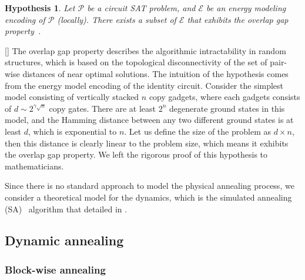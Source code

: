 \documentclass[twocolumn,superscriptaddress,english,showpacs,longbibliography]{revtex4-2}
\newtheorem{hyp}{Hypothesis}
\newcommand{\jinguo}[1]{[{\color{blue}{JGL: #1}}]}
\newcommand{\ym}[1]{[{\color{red}{YM: #1}}]}
\begin{document}
\begin{hyp}\label{hyp:overlap-gap}
Let $\mathcal{P}$ be a circuit SAT problem, and $\mathcal{E}$ be an energy modeling encoding of $\mathcal{P}$ (locally). There exists a subset of $\mathcal{E}$ that exhibits the overlap gap property~\cite{Gamarnik2021}.
\end{hyp}
\ym{I don't understand the following sentence. ``...set of ...'' seems weird.}
The overlap gap property describes the algorithmic intractability in random structures, which is based on the topological disconnectivity of the set of pair-wise distances of near optimal solutions.
The intuition of the hypothesis comes from the energy model encoding of the identity circuit.
Consider the simplest model consisting of vertically stacked $n$ copy gadgets, where each gadgets consists of $d \sim 2^{\gamma \sqrt{n}}$ copy gates.
There are at least $2^n$ degenerate ground states in this model, and the Hamming distance between any two different ground states is at least $d$, which is exponential to $n$. Let us define the size of the problem as $d\times n$, then this distance is clearly linear to the problem size,
which means  it exhibits the overlap gap property. 
We left the rigorous proof of this hypothesis to mathematicians.

Since there is no standard approach to model the physical annealing process, we consider a theoretical model for the dynamics, which is the simulated annealing (SA)~\cite{Kirkpatrick1983} algorithm that detailed in .

\subsection{Dynamic annealing}\label{cooling-computation-with-moving-heat-bath}

\subsubsection{Block-wise annealing}
\end{document}
